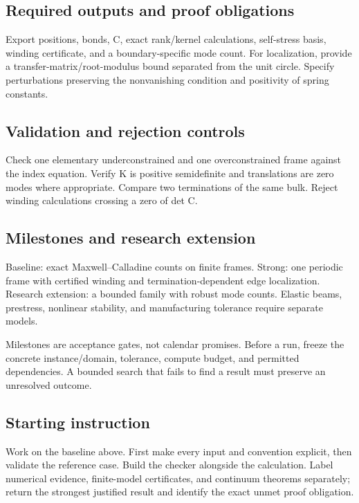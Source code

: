 \documentclass[
  11pt,
]{article}
\begin{document}
\subsection{Required outputs and proof obligations}

Export positions, bonds, C, exact rank/kernel calculations, self-stress
basis, winding certificate, and a boundary-specific mode count. For
localization, provide a transfer-matrix/root-modulus bound separated
from the unit circle. Specify perturbations preserving the nonvanishing
condition and positivity of spring constants.

\subsection{Validation and rejection controls}

Check one elementary underconstrained and one overconstrained frame
against the index equation. Verify K is positive semidefinite and
translations are zero modes where appropriate. Compare two terminations
of the same bulk. Reject winding calculations crossing a zero of det C.

\subsection{Milestones and research extension}

Baseline: exact Maxwell--Calladine counts on finite frames. Strong: one
periodic frame with certified winding and termination-dependent edge
localization. Research extension: a bounded family with robust mode
counts. Elastic beams, prestress, nonlinear stability, and manufacturing
tolerance require separate models.

Milestones are acceptance gates, not calendar promises. Before a run,
freeze the concrete instance/domain, tolerance, compute budget, and
permitted dependencies. A bounded search that fails to find a result
must preserve an unresolved outcome.

\subsection{Starting instruction}

Work on the baseline above. First make every input and convention
explicit, then validate the reference case. Build the checker alongside
the calculation. Label numerical evidence, finite-model certificates,
and continuum theorems separately; return the strongest justified result
and identify the exact unmet proof obligation.
\end{document}
